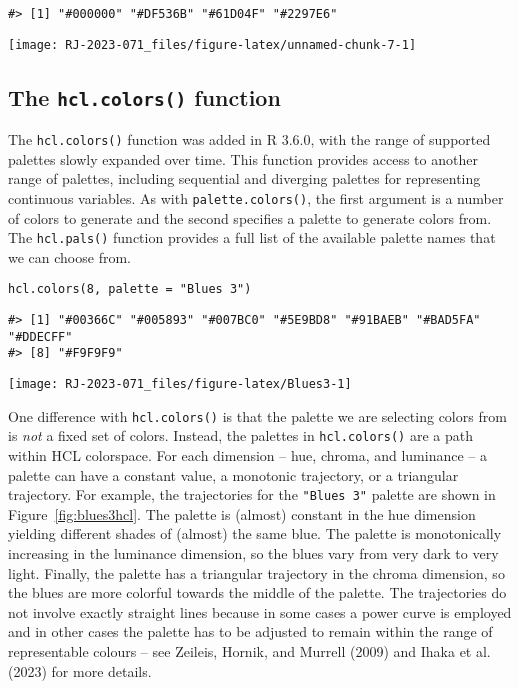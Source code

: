 \begin{verbatim}
#> [1] "#000000" "#DF536B" "#61D04F" "#2297E6"
\end{verbatim}

\texttt{[image: RJ-2023-071\_files/figure-latex/unnamed-chunk-7-1]}

\hypertarget{the-hcl.colors-function}{%
\subsection{\texorpdfstring{The \texttt{hcl.colors()} function}{The hcl.colors() function}}\label{the-hcl.colors-function}}

The \texttt{hcl.colors()} function was added in R 3.6.0, with the range
of supported palettes slowly expanded over time.
This function provides access to another range of palettes,
including sequential and diverging palettes
for representing continuous variables.
As with \texttt{palette.colors()}, the first
argument is a number of colors to generate and the second
specifies a palette to generate colors from.
The \texttt{hcl.pals()} function provides a full list of the
available palette names that we can choose from.

\begin{verbatim}
hcl.colors(8, palette = "Blues 3")
\end{verbatim}

\begin{verbatim}
#> [1] "#00366C" "#005893" "#007BC0" "#5E9BD8" "#91BAEB" "#BAD5FA" "#DDECFF"
#> [8] "#F9F9F9"
\end{verbatim}

\texttt{[image: RJ-2023-071\_files/figure-latex/Blues3-1]}

One difference with \texttt{hcl.colors()} is that the palette we are
selecting colors from is \emph{not} a fixed set of colors. Instead,
the palettes in \texttt{hcl.colors()} are a path within HCL colorspace. For each
dimension -- hue, chroma, and luminance -- a palette can have a constant
value, a monotonic trajectory, or a triangular trajectory. For
example, the trajectories for the \texttt{"Blues\ 3"} palette are shown in
Figure~\ref{fig:blues3hcl}. The palette is (almost) constant in the hue
dimension yielding different shades of (almost) the same blue.
The palette is monotonically increasing in the luminance dimension, so
the blues vary from very dark to very light. Finally, the palette has a
triangular trajectory in the chroma dimension, so the blues are more
colorful towards the middle of the palette.
The trajectories do not involve exactly straight lines
because in some cases a power curve is employed and in other cases
the palette has to be adjusted to remain within the range of
representable colours -- see Zeileis, Hornik, and Murrell (2009) and Ihaka et al. (2023)
for more details.

